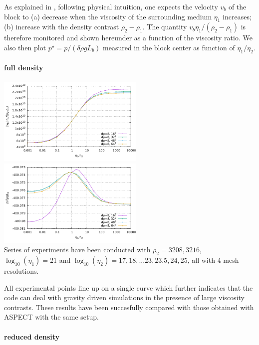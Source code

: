 As explained in \cite{thie11}, following physical intuition, one expects 
the velocity $v_b$ of the block to (a) decrease when the viscosity
of the surrounding medium $\eta_1$ increases; (b) increase with the
density contrast $\rho_2-\rho_1$. 
The quantity $v_b \eta_1/(\rho_2-\rho_1)$ is therefore monitored and shown hereunder as a function of 
the viscosity ratio.
We also then plot $p^\star=p/(\delta \rho g L_b)$ measured in the block center 
as function of $\eta_1/\eta_2$. 

\paragraph{full density}

\begin{center}
\includegraphics[width=7cm]{python_codes/fieldstone_53/results/full/results_v.pdf}
\includegraphics[width=7cm]{python_codes/fieldstone_53/results/full/results_p.pdf}\\
{\captionfont
Series of experiments have been conducted with $\rho_2=3208,3216$, 
$\log_{10}(\eta_1)=21$ and $\log_{10}(\eta_2)=17,18,...23,23.5,24,25$, 
all with 4 mesh resolutions.}
 \end{center}

All experimental points line up on a single curve which further
indicates that the code can deal with gravity driven simulations in the presence
of large viscosity contrasts. These results have been succesfully compared with 
those obtained with ASPECT with the same setup.

\paragraph{reduced density}

